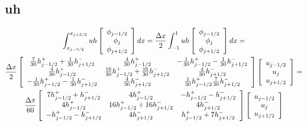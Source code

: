 \documentclass[12pt]{article}
\begin{document}
\subsection{uh}

\begin{multline*}
\int_{x_{j-3/2}}^{x_{j+3/2}} uh \left[\begin{array}{c}\phi_{j-1/2} \\\phi_{j}\\\phi_{j+1/2} \end{array}\right] dx=  \frac{\Delta x}{2}\int_{-1}^{1} uh \left[\begin{array}{c}\phi_{j-1/2} \\\phi_{j}\\\phi_{j+1/2} \end{array}\right] dx =\\
\frac{\Delta x}{2}  
\left[\begin{array}{c c c } 
\frac{7}{30} h^+_{j - 1/2} + \frac{1}{30} h^-_{j + 1/2} & \frac{4}{30} h^+_{j - 1/2}  &  -\frac{1}{30} h^+_{j - 1/2} - \frac{1}{30} h^-_{j + 1/2}\\
\frac{4}{30} h^+_{j - 1/2} & \frac{16}{30} h^+_{j - 1/2} + \frac{16}{30} h^-_{j + 1/2}  &  \frac{4}{30} h^-_{j + 1/2}\\
-\frac{1}{30} h^+_{j - 1/2} - \frac{1}{30} h^-_{j + 1/2} & \frac{4}{30} h^-_{j + 1/2}  &  \frac{1}{30} h^+_{j - 1/2}  \frac{7}{30} h^-_{j + 1/2}\\
 \end{array}\right] \left[\begin{array}{c}u_{j-1/2} \\u_{j}\\u_{j+1/2} \end{array}\right]
 =\\
 \frac{\Delta x}{60}  
 \left[\begin{array}{c c c } 
 7 h^+_{j - 1/2} +  h^-_{j + 1/2} & 4 h^+_{j - 1/2}  &  - h^+_{j - 1/2} -  h^-_{j + 1/2}\\
 4 h^+_{j - 1/2} & 16 h^+_{j - 1/2} + 16 h^-_{j + 1/2}  &  4 h^-_{j + 1/2}\\
 - h^+_{j - 1/2} -  h^-_{j + 1/2} & 4 h^-_{j + 1/2}  &   h^+_{j - 1/2}  + 7 h^-_{j + 1/2}\\
 \end{array}\right] \left[\begin{array}{c}u_{j-1/2} \\u_{j}\\u_{j+1/2} \end{array}\right]
\end{multline*}
\end{document}
